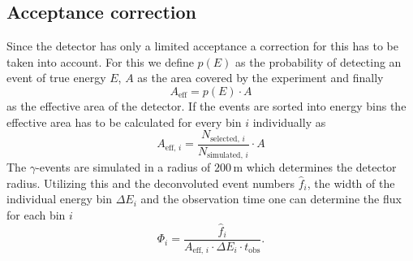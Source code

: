 \subsection{Acceptance correction}
Since the detector has only a limited acceptance a correction for this has to be taken into account. 
For this we define $p(E)$ as the probability of detecting an event of true energy $E$, $A$ as the 
area covered by the experiment and finally 
\begin{equation}
    A_\text{eff} = p(E) \cdot A
\end{equation}
as the effective area of the detector. If the events are sorted into energy bins the effective area has to be calculated for 
every bin $i$ individually as 
\begin{equation}
    A_{\text{eff}, \, i} = \frac{N_{\text{selected}, \, i}}{N_{\text{simulated}, \, i}} \cdot A
\end{equation}
The $\gamma$-events are simulated in a radius of $200 \, \si{\metre}$ which determines the detector radius.
Utilizing this and the deconvoluted event numbers $\hat{f}_i$, the width of the individual energy bin $\Delta E_i$ and the observation time 
one can determine the flux for each bin $i$
\begin{equation}
    \Phi_i = \frac{\hat{f}_i}{A_{\text{eff}, \, i} \cdot \Delta E_i \cdot t_\text{obs}}.
\end{equation}
